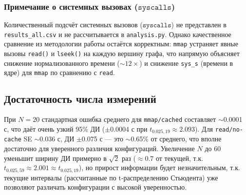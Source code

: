 \documentclass[12pt,a4paper]{article}
\begin{document}
\subsubsection*{Примечание о системных вызовах ($\texttt{syscalls}$)}
Количественный подсчёт системных вызовов ($\texttt{syscalls}$) не представлен в \texttt{results\_all.csv} и не рассчитывается в \texttt{analysis.py}. Однако качественное сравнение из методологии работы остаётся корректным: \texttt{mmap} устраняет явные вызовы \texttt{read()} и \texttt{lseek()} на каждую вершину графа, что напрямую объясняет снижение нормализованного времени ($\sim12\times$) и снижение \texttt{sys\_s} (времени в ядре) для \texttt{mmap} по сравнению с \texttt{read}.

\subsection{Достаточность числа измерений}
При $N = 20$ стандартная ошибка среднего для \texttt{mmap/cached} составляет $\sim$0.0001 с, что даёт очень узкий 95\% ДИ ($\pm$0.0004 с при $t_{0.025,19} \approx 2.093$). Для \texttt{read/no-cache} SE $\sim$0.036 с, ДИ $\pm$0.075 с — это $\sim$0.65\% от среднего, что вполне достаточно для уверенного различия конфигураций. Увеличение $N$ до 60 уменьшит ширину ДИ примерно в $\sqrt{2}$ раз ($\approx 0.7$ от текущей, т.к. $t_{0.025,59} \approx 2.001 \approx t_{0.025,19}$), но прирост информации будет незначительным, т.к. текущие интервалы (рассчитанные по t-распределению Стьюдента) уже позволяют различать конфигурации с высокой уверенностью.
\end{document}
